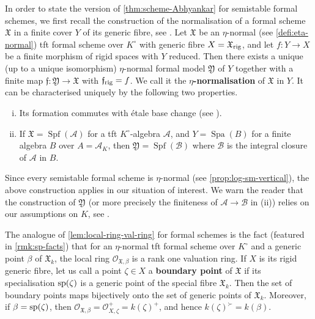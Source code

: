 \documentclass[a4paper,twoside,11pt,reqno]{amsart}
\newcommand{\cO}{{\mathcal O}}
\newcommand{\fX}{{\mathfrak{X}}}
\newcommand{\fY}{{\mathfrak{Y}}}
\DeclareMathOperator{\Spf}{Spf}
\DeclareMathOperator{\Spa}{Spa}
\newcommand{\rig}{{\rm rig}}
\theoremstyle{definition}
\numberwithin{equation}{subsection}
\begin{document}
In order to state the version of \cref{thm:scheme-Abhyankar} for semistable formal schemes, we first recall the construction of the normalisation of a formal scheme $\fX$ in a finite cover $Y$ of its generic fibre, see \cite[Lemma~4.1]{AchingerLaraYoucis2022}. Let $\fX$ be an $\eta$-normal (see \cref{defi:eta-normal}) tft formal scheme over $K^\circ$ with generic fibre $X = \fX_{\rm rig}$, and let $f\colon Y\to X$ be a finite morphism of rigid spaces with $Y$ reduced. Then there exists a unique (up to a unique isomorphism) $\eta$-normal formal model $\fY$ of $Y$ together with a finite map $\mathfrak{f}\colon \fY\to \fX$ with $\mathfrak{f}_\rig = f$. We call it the {\bf $\eta$-normalisation} of $\fX$ in $Y$. It can be characterised uniquely by the following two properties.
\begin{enumerate}[(i)]
    \item Its formation commutes with \'etale base change (see \cite[Appendix~A]{AchingerLaraYoucis2022}).
    \item If $\fX = \Spf(\mathcal{A})$ for a tft $K^\circ$-algebra $\mathcal{A}$, and $Y = \Spa(B)$ for a finite algebra $B$ over $A = \mathcal{A}_K$, then $\fY = \Spf(\mathcal{B})$ where $\mathcal{B}$ is the integral closure of $\mathcal{A}$ in $B$. 
\end{enumerate}
Since every semistable formal scheme is $\eta$-normal (see \cref{prop:log-sm-vertical}), the above construction applies in our situation of interest. We warn the reader that the construction of $\mathfrak{Y}$ (or more precisely the finiteness of $\mathcal{A}\to\mathcal{B}$ in (ii)) relies on our assumptions on $K$, see \cite[Remark~4.3]{AchingerLaraYoucis2022}.

The analogue of \cref{lem:local-ring-val-ring} for formal schemes is the fact (featured in \cref{rmk:sp-facts}) that for an $\eta$-normal tft formal scheme over $K^\circ$ and a generic point $\beta$ of $\fX_k$, the local ring $\cO_{\fX,\beta}$ is a rank one valuation ring. If $X$ is its rigid generic fibre, let us call a point $\zeta\in X$ a {\bf boundary point} of $\fX$ if its specialisation ${\rm sp}(\zeta)$ is a generic point of the special fibre $\fX_k$. Then the set of boundary points maps bijectively onto the set of generic points of $\fX_k$. Moreover, if $\beta = {\rm sp}(\zeta)$, then $\cO_{\fX,\beta}=\cO_{X,\zeta}^+=k(\zeta)^+$, and hence $k(\zeta)^\succ = k(\beta)$.
\end{document}
